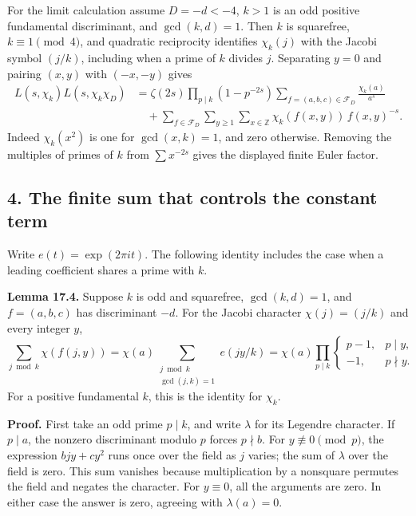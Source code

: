 \documentclass[
  11pt,
  a4paper,
]{article}
\begin{document}
For the limit calculation assume \(D=-d<-4\), \(k>1\) is an odd positive
fundamental discriminant, and \(\gcd(k,d)=1\). Then \(k\) is squarefree,
\(k\equiv1\pmod4\), and quadratic reciprocity identifies \(\chi_k(j)\)
with the Jacobi symbol \((j/k)\), including when a prime of \(k\)
divides \(j\). Separating \(y=0\) and pairing \((x,y)\) with \((-x,-y)\)
gives \[
 \begin{aligned}
 L(s,\chi_k)L(s,\chi_k\chi_D)
 &=\zeta(2s)\prod_{p\mid k}(1-p^{-2s})
                \sum_{f=(a,b,c)\in\mathcal F_D}\frac{\chi_k(a)}{a^s}\\
 &\quad+\sum_{f\in\mathcal F_D}\sum_{y\ge1}\sum_{x\in\mathbb Z}
           \chi_k(f(x,y))\,f(x,y)^{-s}.
 \end{aligned}
 \tag{17.11}
\] Indeed \(\chi_k(x^2)\) is one for \(\gcd(x,k)=1\), and zero
otherwise. Removing the multiples of primes of \(k\) from
\(\sum x^{-2s}\) gives the displayed finite Euler factor.

\subsection{4. The finite sum that controls the constant
term}\label{the-finite-sum-that-controls-the-constant-term}

Write \(e(t)=\exp(2\pi it)\). The following identity includes the case
when a leading coefficient shares a prime with \(k\).

\textbf{Lemma 17.4.} Suppose \(k\) is odd and squarefree,
\(\gcd(k,d)=1\), and \(f=(a,b,c)\) has discriminant \(-d\). For the
Jacobi character \(\chi(j)=(j/k)\) and every integer \(y\), \[
 \sum_{j\bmod k}\chi(f(j,y))
 =\chi(a)\sum_{\substack{j\bmod k\\\gcd(j,k)=1}}e(jy/k)
 =\chi(a)\prod_{p\mid k}
       \begin{cases}p-1,&p\mid y,\\-1,&p\nmid y.\end{cases}
 \tag{17.12}
\] For a positive fundamental \(k\), this is the identity for
\(\chi_k\).

\textbf{Proof.} First take an odd prime \(p\mid k\), and write
\(\lambda\) for its Legendre character. If \(p\mid a\), the nonzero
discriminant modulo \(p\) forces \(p\nmid b\). For
\(y\not\equiv0\pmod p\), the expression \(bjy+cy^2\) runs once over the
field as \(j\) varies; the sum of \(\lambda\) over the field is zero.
This sum vanishes because multiplication by a nonsquare permutes the
field and negates the character. For \(y\equiv0\), all the arguments are
zero. In either case the answer is zero, agreeing with \(\lambda(a)=0\).
\end{document}

